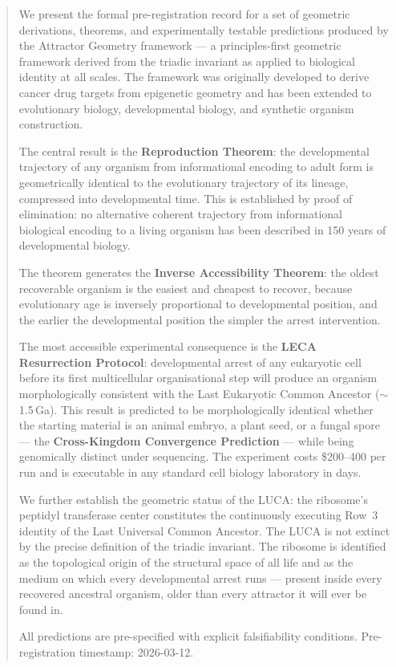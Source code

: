 \documentclass[12pt, a4paper]{article}
\theoremstyle{definition}
\theoremstyle{remark}
\begin{document}
\begin{abstract}
\noindent
We present the formal pre-registration record for a set of
geometric derivations, theorems, and experimentally testable
predictions produced by the Attractor Geometry framework ---
a principles-first geometric framework derived from the
triadic invariant as applied to biological identity at all
scales. The framework was originally developed to derive
cancer drug targets from epigenetic geometry and has been
extended to evolutionary biology, developmental biology, and
synthetic organism construction.

The central result is the \textbf{Reproduction Theorem}: the
developmental trajectory of any organism from informational
encoding to adult form is geometrically identical to the
evolutionary trajectory of its lineage, compressed into
developmental time. This is established by proof of
elimination: no alternative coherent trajectory from
informational biological encoding to a living organism has
been described in 150 years of developmental biology.

The theorem generates the \textbf{Inverse Accessibility
Theorem}: the oldest recoverable organism is the easiest and
cheapest to recover, because evolutionary age is inversely
proportional to developmental position, and the earlier the
developmental position the simpler the arrest intervention.

The most accessible experimental consequence is the
\textbf{LECA Resurrection Protocol}: developmental arrest of
any eukaryotic cell before its first multicellular
organisational step will produce an organism morphologically
consistent with the Last Eukaryotic Common Ancestor
($\sim$1.5\,Ga). This result is predicted to be
morphologically identical whether the starting material is an
animal embryo, a plant seed, or a fungal spore --- the
\textbf{Cross-Kingdom Convergence Prediction} --- while being
genomically distinct under sequencing. The experiment costs
\$200--400 per run and is executable in any standard cell
biology laboratory in days.

We further establish the geometric status of the LUCA: the
ribosome's peptidyl transferase center constitutes the
continuously executing Row~3 identity of the Last Universal
Common Ancestor. The LUCA is not extinct by the precise
definition of the triadic invariant. The ribosome is
identified as the topological origin of the structural space
of all life and as the medium on which every developmental
arrest runs --- present inside every recovered ancestral
organism, older than every attractor it will ever be found in.

All predictions are pre-specified with explicit falsifiability
conditions. Pre-registration timestamp: 2026-03-12.
\end{abstract}
\end{document}
